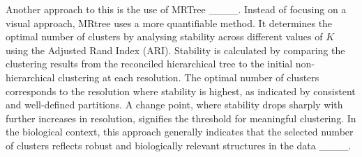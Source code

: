 Another approach to this is the use of MRTree ____. Instead of focusing on a visual approach, MRtree uses a more quantifiable method. It determines the optimal number of clusters by analysing stability across different values of $K$ using the Adjusted Rand Index (ARI). Stability is calculated by comparing the clustering results from the reconciled hierarchical tree to the initial non-hierarchical clustering at each resolution. The optimal number of clusters corresponds to the resolution where stability is highest, as indicated by consistent and well-defined partitions.  A change point, where stability drops sharply with further increases in resolution, signifies the threshold for meaningful clustering. In the biological context, this approach generally indicates that the selected number of clusters reflects robust and biologically relevant structures in the data ____. %